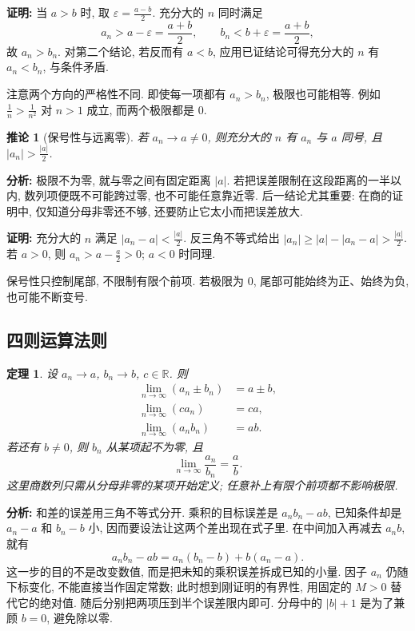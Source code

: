 \documentclass[UTF8,openany]{ctexbook}
\theoremstyle{chinesetextbook}
\newtheorem{theorem}{定理}[section]
\newenvironment{cnproof}{\par\indent\textbf{证明:} \ignorespaces}{\par}
\newtheorem*{corollarysingle}{推论}
\begin{document}
\begin{cnproof}
当 $a>b$ 时, 取 $\displaystyle \varepsilon=\frac{a-b}{2}$. 充分大的 $n$ 同时满足
\[
a_n>a-\varepsilon=\frac{a+b}{2},\qquad
b_n<b+\varepsilon=\frac{a+b}{2},
\]
故 $a_n>b_n$. 对第二个结论, 若反而有 $a<b$, 应用已证结论可得充分大的 $n$ 有 $a_n<b_n$, 与条件矛盾.
\end{cnproof}
注意两个方向的严格性不同. 即使每一项都有 $a_n>b_n$, 极限也可能相等. 例如 $\displaystyle \frac1n>\frac1{n^2}$ 对 $n>1$ 成立, 而两个极限都是 $0$.
\begin{corollarysingle}[保号性与远离零]
若 $a_n\to a\ne0$, 则充分大的 $n$ 有 $a_n$ 与 $a$ 同号, 且 $\displaystyle |a_n|>\frac{|a|}{2}$.
\end{corollarysingle}
\par\indent\textbf{分析:} 极限不为零, 就与零之间有固定距离 $|a|$. 若把误差限制在这段距离的一半以内, 数列项便既不可能跨过零, 也不可能任意靠近零. 后一结论尤其重要: 在商的证明中, 仅知道分母非零还不够, 还要防止它太小而把误差放大.


\begin{cnproof}
充分大的 $n$ 满足 $\displaystyle |a_n-a|<\frac{|a|}{2}$. 反三角不等式给出 $\displaystyle |a_n|\ge|a|-|a_n-a|>\frac{|a|}{2}$. 若 $a>0$, 则 $\displaystyle a_n>a-\frac a2>0$; $a<0$ 时同理.
\end{cnproof}
保号性只控制尾部, 不限制有限个前项. 若极限为 $0$, 尾部可能始终为正、始终为负, 也可能不断变号.
\subsection{四则运算法则}
\begin{theorem}
设 $a_n\to a$, $b_n\to b$, $c\in\mathbb R$. 则
\[
\begin{aligned}
\lim_{n\to\infty}(a_n\pm b_n)&=a\pm b,\\
\lim_{n\to\infty}(ca_n)&=ca,\\
\lim_{n\to\infty}(a_nb_n)&=ab.
\end{aligned}
\]
若还有 $b\ne0$, 则 $b_n$ 从某项起不为零, 且
\[
\lim_{n\to\infty}\frac{a_n}{b_n}=\frac ab.
\]
这里商数列只需从分母非零的某项开始定义; 任意补上有限个前项都不影响极限.
\end{theorem}
\par\indent\textbf{分析:} 和差的误差用三角不等式分开. 乘积的目标误差是 $a_nb_n-ab$, 已知条件却是 $a_n-a$ 和 $b_n-b$ 小, 因而要设法让这两个差出现在式子里. 在中间加入再减去 $a_nb$, 就有
\[
a_nb_n-ab=a_n(b_n-b)+b(a_n-a).
\]
这一步的目的不是改变数值, 而是把未知的乘积误差拆成已知的小量. 因子 $a_n$ 仍随下标变化, 不能直接当作固定常数; 此时想到刚证明的有界性, 用固定的 $M>0$ 替代它的绝对值. 随后分别把两项压到半个误差限内即可. 分母中的 $|b|+1$ 是为了兼顾 $b=0$, 避免除以零.
\end{document}
